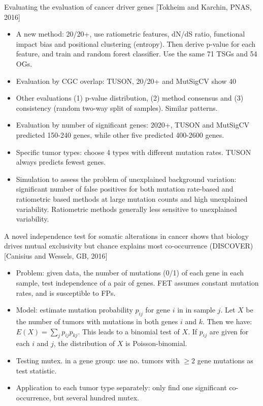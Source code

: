 \documentclass{report}
\begin{document}
Evaluating the evaluation of cancer driver genes [Tokheim and Karchin, PNAS, 2016]
\begin{itemize}
	
	\item A new method: 20/20+, use ratiometric features, dN/dS ratio, functional impact bias and positional clustering (entropy). Then derive p-value for each feature, and train and random forest classifier. Use the same 71 TSGs and 54 OGs. 
	
	\item Evaluation by CGC overlap: TUSON, 20/20+ and MutSigCV show 40%
	
	\item Other evaluations (1) p-value distribution, (2) method consensus and (3) consistency (random two-way split of samples). Similar patterns. 
	
	\item Evaluation by number of significant genes: 2020+, TUSON and MutSigCV predicted 150-240 genes, while other five predicted 400-2600 genes. 
	
	\item Specific tumor types: choose 4 types with different mutation rates. TUSON always predicts fewest genes. 
	
	\item Simulation to assess the problem of unexplained background variation: significant number of false positives for both mutation rate-based and ratiometric based methods at large mutation counts and high unexplained variability. Ratiometric methods generally less sensitive to unexplained variability. 
\end{itemize}

A novel independence test for somatic alterations in cancer shows that biology drives mutual exclusivity but chance explains most co-occurrence (DISCOVER) [Canisius and Wessels, GB, 2016]
\begin{itemize}
	\item Problem: given data, the number of mutations (0/1) of each gene in each sample, test independence of a pair of genes. FET assumes constant mutation rates, and is susceptible to FPs.
	
	\item Model: estimate mutation probability $p_{ij}$ for gene $i$ in in sample $j$. Let $X$ be the number of tumors with mutations in both genes $i$ and $k$. Then we have: $E(X) = \sum_j p_{ij} p_{kj}$. This leads to a binomial test of $X$. If $p_{ij}$ are given for each $i$ and $j$, the distribution of $X$ is Poisson-binomial.
	
	\item Testing mutex. in a gene group: use no. tumors with $\geq 2$ gene mutations as test statistic.
	
	\item Application to each tumor type separately: only find one significant co-occurrence, but several hundred mutex.
\end{itemize}
\end{document}
